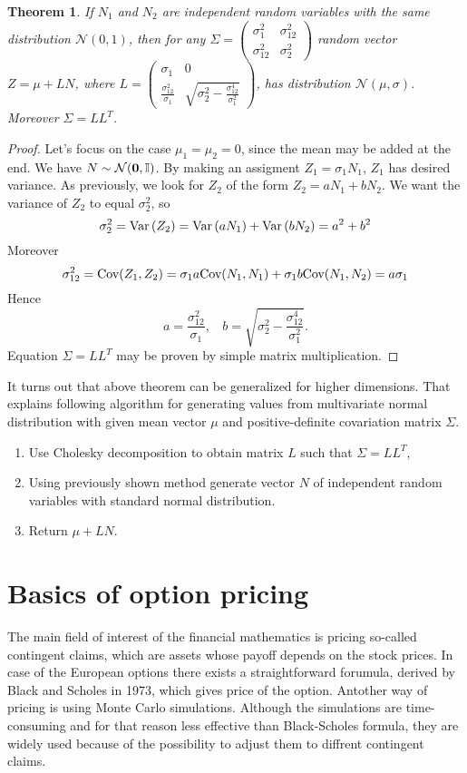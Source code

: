 \documentclass[a4paper,12pt, oneside]{book}
\newtheorem{thm}{Theorem}[section]
\theoremstyle{definition}
\theoremstyle{remark}
\def\Var{{\rm Var}\,}
\def\Cov{{\hbox{Cov}}}
\begin{document}
\begin{thm}
 If $N_1$ and $N_2$ are independent random variables with the same distribution $\mathcal{N}(0,1)$, then for any
 $\Sigma = \left( \begin{array}{cc}
                      \sigma_1^2 & \sigma_{12}^2 \\
                      \sigma_{12}^2 & \sigma_2^2
                   \end{array} \right)$
 random vector $ Z = \mu + LN$, where
  $L = \left( \begin{array}{cc}
                      \sigma_1 & 0 \\
                      \frac{\sigma_{12}^2}{\sigma_1} & \sqrt{\sigma_2^2 - \frac{\sigma_{12}^4}{\sigma_1^2}}
                   \end{array} \right)$,
 has distribution $\mathcal{N}(\mu,\sigma)$. Moreover $\Sigma = LL^T$.
\end{thm}
\begin{proof}
Let's focus on the case $\mu_1 = \mu_2 = 0$, since the mean may be added at the end. We have $N \sim \mathcal{N}(\bf{0}, \mathbb{I})$. By making an assigment $Z_1 = \sigma_1 N_1$, $Z_1$ has desired variance. As previously, we look for $Z_2$ of the form $Z_2 = a N_1 + b N_2$. We want the variance of $Z_2$ to equal $\sigma_2^2$, so
\[ \sigma_2^2 = \Var(Z_2) = \Var( a N_1) +  \Var(b N_2) = a^2 + b^2 \]
Moreover
\[ \sigma_{12}^2 = \Cov(Z_1, Z_2) = \sigma_1 a\Cov(N_1, N_1) + \sigma_1 b\Cov(N_1, N_2) = a\sigma_1 \]
Hence
\[ a = \frac{\sigma_{12}^2}{\sigma_1},\ \ \ \ b = \sqrt{\sigma_2^2 - \frac{\sigma_{12}^4}{\sigma_1^2}}. \] 
Equation $\Sigma = LL^T$ may be proven by simple matrix multiplication.
\end{proof}

It turns out that above theorem can be generalized for higher dimensions. That explains following algorithm for generating values from multivariate normal distribution with given mean vector $\mu$ and positive-definite covariation matrix $\Sigma$. 
\begin{enumerate}
 \item Use Cholesky decomposition to obtain matrix $L$ such that $\Sigma = LL^T$,
 \item Using previously shown method generate vector $N$ of independent random variables with standard normal distribution.
 \item Return $\mu + LN$.
\end{enumerate}


\chapter{Basics of option pricing}
The main field of interest of the financial mathematics is pricing so-called contingent claims, which are assets whose payoff depends on the stock prices. In case of the European options there exists a straightforward forumula, derived by Black and Scholes in 1973, which gives price of the option. Antother way of pricing is using Monte Carlo simulations. Although the simulations are time-consuming and for that reason less effective than Black-Scholes formula, they are widely used because of the possibility to adjust them to diffrent contingent claims. 
\end{document}
